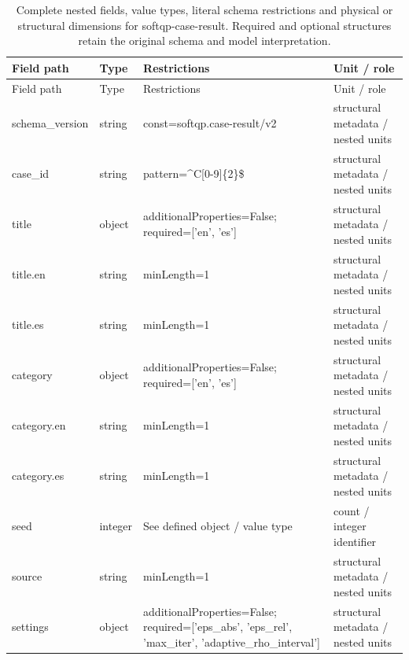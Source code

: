 \begingroup\footnotesize\setlength{\tabcolsep}{3pt}
\begin{longtable}{@{}>{\raggedright\arraybackslash}p{}>{\raggedright\arraybackslash}p{}>{\raggedright\arraybackslash}p{}>{\raggedright\arraybackslash}p{}@{}}
\caption{Complete nested fields, value types, literal schema restrictions and physical or structural dimensions for softqp-case-result. Required and optional structures retain the original schema and model interpretation.}\label{tab:nested-softqp-case-result}\\
\toprule Field path & Type & Restrictions & Unit / role\\\midrule\endfirsthead
\toprule Field path & Type & Restrictions & Unit / role\\\midrule\endhead
\bottomrule\endfoot
schema\_\allowbreak{}version & string & const=\allowbreak{}softqp.\allowbreak{}case-\allowbreak{}result/\allowbreak{}v2 & structural metadata /\allowbreak{} nested units\\
case\_\allowbreak{}id & string & pattern=\allowbreak{}\textasciicircum{}C[0-9]\{2\}\$ & structural metadata /\allowbreak{} nested units\\
title & object & additionalProperties=\allowbreak{}False; required=\allowbreak{}['en', 'es'] & structural metadata /\allowbreak{} nested units\\
title.\allowbreak{}en & string & minLength=\allowbreak{}1 & structural metadata /\allowbreak{} nested units\\
title.\allowbreak{}es & string & minLength=\allowbreak{}1 & structural metadata /\allowbreak{} nested units\\
category & object & additionalProperties=\allowbreak{}False; required=\allowbreak{}['en', 'es'] & structural metadata /\allowbreak{} nested units\\
category.\allowbreak{}en & string & minLength=\allowbreak{}1 & structural metadata /\allowbreak{} nested units\\
category.\allowbreak{}es & string & minLength=\allowbreak{}1 & structural metadata /\allowbreak{} nested units\\
seed & integer & See defined object /\allowbreak{} value type & count /\allowbreak{} integer identifier\\
source & string & minLength=\allowbreak{}1 & structural metadata /\allowbreak{} nested units\\
settings & object & additionalProperties=\allowbreak{}False; required=\allowbreak{}['eps\_\allowbreak{}abs', 'eps\_\allowbreak{}rel', 'max\_\allowbreak{}iter', 'adaptive\_\allowbreak{}rho\_\allowbreak{}interval'] & structural metadata /\allowbreak{} nested units\\

\end{longtable}
